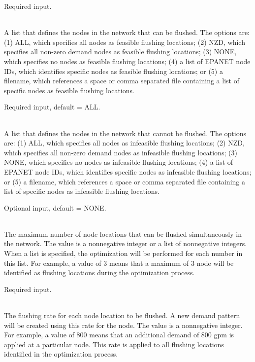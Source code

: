 \begin{description}[topsep=0pt,parsep=0.5em,itemsep=-0.4em]
\begin{description}[topsep=0pt,parsep=0.5em,itemsep=-0.4em]
                Required input.
    \item[{flush nodes}]\hfill
    \begin{description}[topsep=0pt,parsep=0.5em,itemsep=-0.4em]
      \item[{feasible nodes}]\hfill
\\A list that defines the nodes in the network that can be flushed. 
                The options are: (1) ALL, which specifies all nodes as feasible flushing locations;
                (2) NZD, which specifies all non-zero demand nodes as feasible flushing locations;
                (3) NONE, which specifies no nodes as feasible flushing locations;
                (4) a list of EPANET node IDs, which identifies specific nodes as feasible flushing locations; or
                (5) a filename, which references a space or comma separated file containing a list of 
                specific nodes as feasible flushing locations.
                
                Required input, default = ALL.
      \item[{infeasible nodes}]\hfill
\\A list that defines the nodes in the network that cannot be flushed. 
                The options are: (1) ALL, which specifies all nodes as infeasible flushing locations;
                (2) NZD, which specifies all non-zero demand nodes as infeasible flushing locations;
                (3) NONE, which specifies no nodes as infeasible flushing locations;
                (4) a list of EPANET node IDs, which identifies specific nodes as infeasible flushing locations; or
                (5) a filename, which references a space or comma separated file containing a list of 
                specific nodes as infeasible flushing locations. 
                
                Optional input, default = NONE.
      \item[{max nodes}]\hfill
\\The maximum number of node locations that can be flushed simultaneously in the
                network. The value is a nonnegative integer or a list of
                nonnegative integers. When a list is specified, the optimization
                will be performed for each number in this list. For example, a value of 
                3 means that a maximum of 3 node will be identified as flushing locations 
                during the optimization process.
                
                Required input.
      \item[{rate}]\hfill
\\The flushing rate for each node location to be flushed. A new demand pattern 
                will be created using this rate for the node. The value is a nonnegative integer. 
                For example, a value of 800 means that an additional demand of 800 gpm is applied 
                at a particular node. This rate is applied to all flushing locations identified 
                in the optimization process.
                

\end{description}
\end{description}
\end{description}
